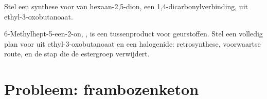\begin{exercise}[$\star\star\star$]\label{exo:b2:retrosynthesis:11}
Stel een synthese voor van hexaan-2,5-dion, een 1,4-dicarbonylverbinding, uit ethyl-3-oxobutanoaat.
\end{exercise}

\begin{exercise}[$\star\star\star$]\label{exo:b2:retrosynthesis:12}
6-Methylhept-5-een-2-on, , is een tussenproduct voor geurstoffen. Stel een volledig plan voor
uit ethyl-3-oxobutanoaat en een halogenide: retrosynthese, voorwaartse route, en de stap die de
estergroep verwijdert.
\end{exercise}

\section{Probleem: frambozenketon}

